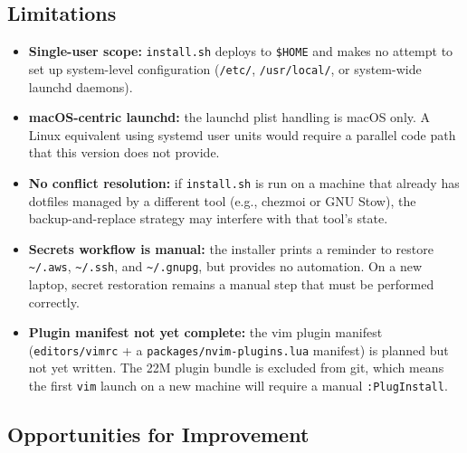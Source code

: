 \documentclass[
  11pt,
  letterpaper,
  DIV=11,
  numbers=noendperiod]{scrartcl}
\providecommand{\tightlist}{%
  \setlength{\itemsep}{0pt}\setlength{\parskip}{0pt}}
\begin{document}
\subsection{Limitations}\label{limitations}

\begin{itemize}
\tightlist
\item
  \textbf{Single-user scope:} \texttt{install.sh} deploys to
  \texttt{\$HOME} and makes no attempt to set up system-level
  configuration (\texttt{/etc/}, \texttt{/usr/local/}, or system-wide
  launchd daemons).
\item
  \textbf{macOS-centric launchd:} the launchd plist handling is macOS
  only. A Linux equivalent using systemd user units would require a
  parallel code path that this version does not provide.
\item
  \textbf{No conflict resolution:} if \texttt{install.sh} is run on a
  machine that already has dotfiles managed by a different tool (e.g.,
  chezmoi or GNU Stow), the backup-and-replace strategy may interfere
  with that tool's state.
\item
  \textbf{Secrets workflow is manual:} the installer prints a reminder
  to restore \texttt{\textasciitilde{}/.aws},
  \texttt{\textasciitilde{}/.ssh}, and
  \texttt{\textasciitilde{}/.gnupg}, but provides no automation. On a
  new laptop, secret restoration remains a manual step that must be
  performed correctly.
\item
  \textbf{Plugin manifest not yet complete:} the vim plugin manifest
  (\texttt{editors/vimrc} + a \texttt{packages/nvim-plugins.lua}
  manifest) is planned but not yet written. The 22M plugin bundle is
  excluded from git, which means the first \texttt{vim} launch on a new
  machine will require a manual \texttt{:PlugInstall}.
\end{itemize}

\subsection{Opportunities for
Improvement}\label{opportunities-for-improvement}
\end{document}
